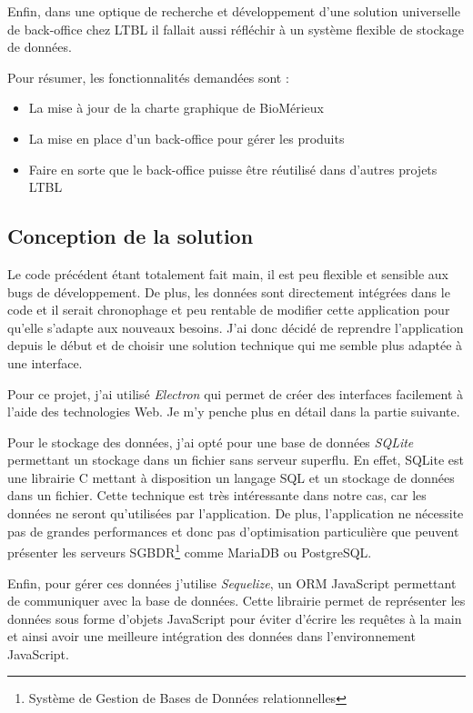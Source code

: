 Enfin, dans une optique de recherche et développement d'une solution universelle de back-office chez LTBL il fallait aussi réfléchir à un système flexible de stockage de données.

Pour résumer, les fonctionnalités demandées sont :

\begin{itemize}
    \item La mise à jour de la charte graphique de BioMérieux
    \item La mise en place d'un back-office pour gérer les produits
    \item Faire en sorte que le back-office puisse être réutilisé dans d'autres projets LTBL
\end{itemize}


\subsection{Conception de la solution}

Le code précédent étant totalement fait main, il est peu flexible et sensible aux bugs de développement.
De plus, les données sont directement intégrées dans le code et il serait chronophage et peu rentable de modifier cette application pour qu'elle s'adapte aux nouveaux besoins.
J'ai donc décidé de reprendre l'application depuis le début et de choisir une solution technique qui me semble plus adaptée à une interface.

Pour ce projet, j'ai utilisé \emph{Electron} qui permet de créer des interfaces facilement à l'aide des technologies Web.
Je m'y penche plus en détail dans la partie suivante.

Pour le stockage des données, j'ai opté pour une base de données \emph{SQLite} permettant un stockage dans un fichier sans serveur superflu.
En effet, SQLite est une librairie C mettant à disposition un langage SQL et un stockage de données dans un fichier.
Cette technique est très intéressante dans notre cas, car les données ne seront qu'utilisées par l'application.
De plus, l'application ne nécessite pas de grandes performances et donc pas d'optimisation particulière que peuvent présenter les serveurs SGBDR\footnote{Système de Gestion de Bases de Données relationnelles} comme MariaDB ou PostgreSQL\@.

Enfin, pour gérer ces données j'utilise \emph{Sequelize}, un ORM JavaScript permettant de communiquer avec la base de données.
Cette librairie permet de représenter les données sous forme d'objets JavaScript pour éviter d'écrire les requêtes à la main et ainsi avoir une meilleure intégration des données dans l'environnement JavaScript.

